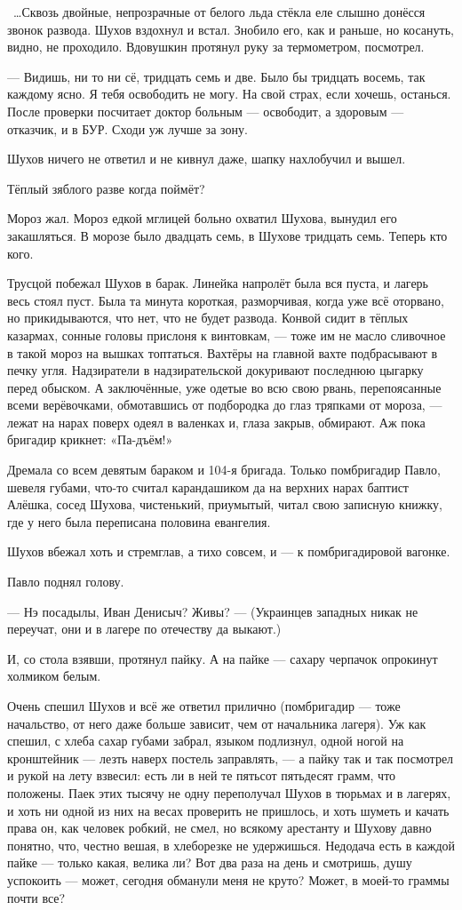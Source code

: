 ~\dots{}Сквозь двойные, непрозрачные от белого льда стёкла еле слышно донёсся звонок развода. 
Шухов вздохнул и встал. Знобило его, как и раньше, но косануть, видно, не проходило. Вдовушкин 
протянул руку за термометром, посмотрел.

--- Видишь, ни то ни сё, тридцать семь и две. Было бы тридцать восемь, так каждому ясно. Я тебя 
освободить не могу. На свой страх, если хочешь, останься. После проверки посчитает доктор 
больным --- освободит, а здоровым --- отказчик, и в БУР. Сходи уж лучше за зону.

Шухов ничего не ответил и не кивнул даже, шапку нахлобучил и вышел.

Тёплый зяблого разве когда поймёт?

Мороз жал. Мороз едкой мглицей больно охватил Шухова, вынудил его закашляться. В морозе было 
двадцать семь, в Шухове тридцать семь. Теперь кто кого.

Трусцой побежал Шухов в барак. Линейка напролёт была вся пуста, и лагерь весь стоял пуст. 
Была та минута короткая, разморчивая, когда уже всё оторвано, но прикидываются, что нет, что 
не будет развода. Конвой сидит в тёплых казармах, сонные головы прислоня к винтовкам, --- тоже 
им не масло сливочное в такой мороз на вышках топтаться. Вахтёры на главной вахте 
подбрасывают в печку угля. Надзиратели в надзирательской докуривают последнюю цыгарку 
перед обыском. А заключённые, уже одетые во всю свою рвань, перепоясанные всеми верёвочками, 
обмотавшись от подбородка до глаз тряпками от мороза, --- лежат на нарах поверх одеял в 
валенках и, глаза закрыв, обмирают. Аж пока бригадир крикнет: «Па-дъём!»

Дремала со всем девятым бараком и 104-я бригада. Только помбригадир Павло, шевеля губами, 
что-то считал карандашиком да на верхних нарах баптист Алёшка, сосед Шухова, чистенький, 
приумытый, читал свою записную книжку, где у него была переписана половина евангелия.

Шухов вбежал хоть и стремглав, а тихо совсем, и --- к помбригадировой вагонке.

Павло поднял голову.

--- Нэ посадылы, Иван Денисыч? Живы? --- (Украинцев западных никак не переучат, они и в лагере по 
отечеству да выкают.)

И, со стола взявши, протянул пайку. А на пайке --- сахару черпачок опрокинут холмиком белым.

Очень спешил Шухов и всё же ответил прилично (помбригадир --- тоже начальство, от него даже 
больше зависит, чем от начальника лагеря). Уж как спешил, с хлеба сахар губами забрал, языком 
подлизнул, одной ногой на кронштейник --- лезть наверх постель заправлять, --- а пайку так и так 
посмотрел и рукой на лету взвесил: есть ли в ней те пятьсот пятьдесят грамм, что положены. 
Паек этих тысячу не одну переполучал Шухов в тюрьмах и в лагерях, и хоть ни одной из них на 
весах проверить не пришлось, и хоть шуметь и качать права он, как человек робкий, не смел, но 
всякому арестанту и Шухову давно понятно, что, честно вешая, в хлеборезке не удержишься. 
Недодача есть в каждой пайке --- только какая, велика ли? Вот два раза на день и смотришь, душу 
успокоить --- может, сегодня обманули меня не круто? Может, в моей-то граммы почти все?

